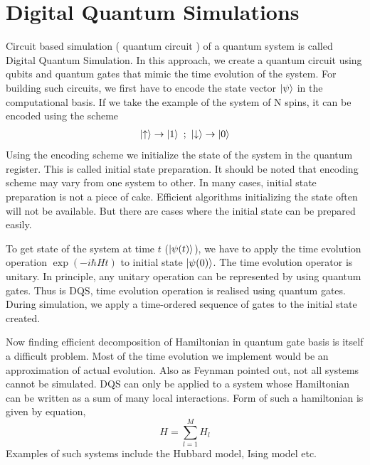\documentclass[12pt,a4paper]{report}
\begin{document}
\section{Digital Quantum Simulations}
Circuit based simulation ( quantum circuit ) of a quantum system is called Digital Quantum Simulation. In this approach, we create a quantum circuit using qubits and quantum gates that mimic the time evolution of the system. For building such circuits, we first have to encode the state vector $\ket{\psi}$ in the computational basis. If we take the example of the system of N spins, it can be encoded using the scheme 
\begin{gather*}
\ket{\uparrow} \rightarrow \ket{1} \ ; \ \ket{\downarrow} \rightarrow \ket{0}
\end{gather*}
Using the encoding scheme we initialize the state of the system in the quantum register. This is called initial state preparation. It should be noted that encoding scheme may vary from one system to other. In many cases, initial state preparation is not a piece of cake. Efficient algorithms initializing the state often will not be available. But there are cases where the initial state can be prepared easily.

To get state of the system at time $t$  ($ \ket{\psi (t)}$), we have to apply the time evolution operation $\exp(-i\hbar Ht)$ to initial state $\ket{\psi (0)}$. The time evolution operator is unitary. In principle, any unitary operation can be represented by using quantum gates. Thus is DQS, time evolution operation is realised using quantum gates. During simulation, we apply a time-ordered sequence of gates to the initial state created.

Now finding efficient decomposition of Hamiltonian in quantum gate basis is itself a difficult problem. Most of the time evolution we implement would be an approximation of actual evolution. Also as Feynman pointed out, not all systems cannot be simulated. DQS can only be applied to a system whose Hamiltonian can be written as a sum of many local interactions. Form of such a hamiltonian is given by equation,
\begin{equation}
H= \sum_{l=1}^{M} H_{l}
\end{equation}
Examples of such systems include the Hubbard model, Ising model etc.
\end{document}
